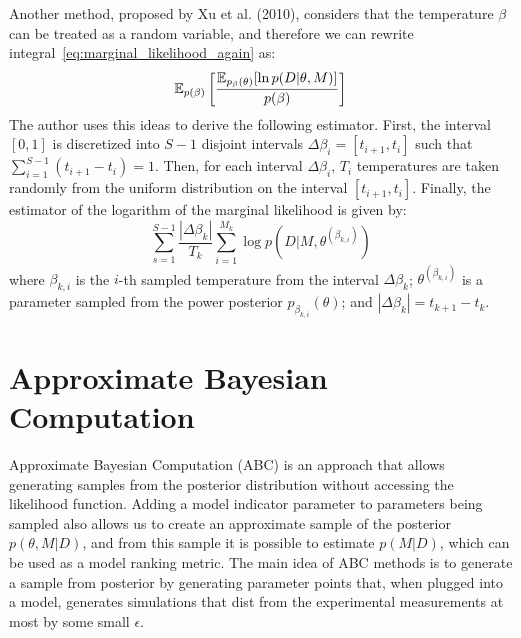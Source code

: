 Another method, proposed by Xu et al. (2010), considers that the 
temperature $\beta$ can be treated as a random variable, and therefore 
we can rewrite integral~\ref{eq:marginal_likelihood_again} as:
\begin{equation}
    \mathbb{E}_{p (\beta)} 
        \left[\frac
            {\mathbb{E}_{p_\beta (\theta)}[\ln p(D|\theta, M)]}
            {p (\beta)}
        \right]
\end{equation}
The author uses this ideas to derive the following estimator. First, 
the interval $[0, 1]$ is discretized into $S - 1$ disjoint intervals 
$\Delta\beta_i = [t_{i + 1}, t_i]$ such that  $\sum_{i = 1}^{S - 1} 
(t_{i + 1} - t_{i}) = 1$. Then, for each interval $\Delta\beta_i$, $T_i$ 
temperatures are taken randomly from the uniform distribution on the 
interval $[t_{i + 1}, t_i]$. Finally, the estimator of the logarithm of
the marginal likelihood is given by:
\begin{equation}
    \sum_{s = 1}^{S - 1}\frac{|\Delta\beta_k|}
                             {T_k}
        \sum_{i = 1}^{M_k} \log p (D | M, \theta^{(\beta_{k, i})})
\end{equation}
where $\beta_{k, i}$ is the $i$-th sampled temperature from the interval
$\Delta\beta_k$; $\theta^{(\beta_{k, i})}$ is a parameter sampled 
from the power posterior $p_{\beta_{k, i}} (\theta)$; and 
$|\Delta\beta_k| = t_{k + 1} - t_k$.



\section{Approximate Bayesian Computation}
Approximate Bayesian Computation (ABC) is an approach that allows 
generating samples from the posterior distribution without accessing the
likelihood function. Adding a model indicator parameter to parameters 
being sampled also allows us to create an approximate sample of the 
posterior $p (\theta, M | D)$, and from this sample it is possible to 
estimate $p (M | D)$, which can be used as a model ranking metric. The 
main idea of ABC methods is to generate a sample from posterior by 
generating parameter points that, when plugged into a model, generates 
simulations that dist from the experimental measurements at most by some
small $\epsilon$.

